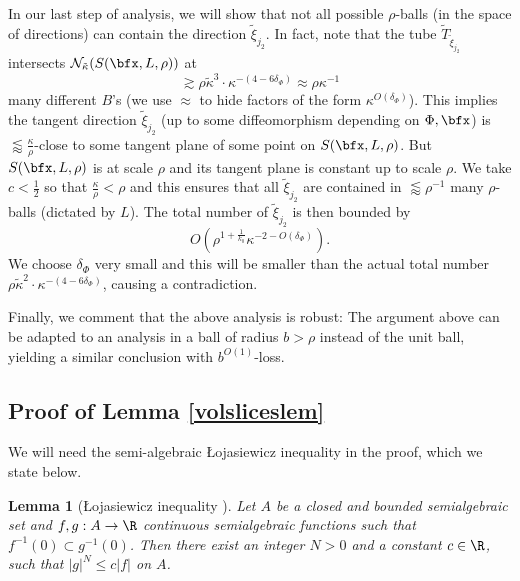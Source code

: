 \documentclass{article}
\numberwithin{equation}{section}
\theoremstyle{plain}
\newtheorem{lemma}[theorem]{Lemma}
\begin{document}
In our last step of analysis, we will show that not all possible $\rho$-balls (in the space of directions) can contain the direction $\tilde{\xi}_{j_2}$. In fact, note that the tube $\tilde{T}_{\tilde{\xi}_{j_2}}$ intersects $\mathcal{N}_{\tilde{\kappa}} (S(\bfx, L, \rho))$ at 
\begin{equation}
    \gtrsim \rho\tilde{\kappa}^3\cdot \kappa^{-(4-6\delta_{\Phi})} \approx \rho \kappa^{-1}
\end{equation}
many different $B$'s (we use $\approx$ to hide factors of the form $\kappa^{O(\delta_{\Phi})}$). This implies the tangent direction $\tilde{\xi}_{j_2}$ (up to some diffeomorphism depending on $\Phi, \bfx$) is $\lessapprox \frac{\kappa}{\rho}$-close to some tangent plane of some point on $S(\bfx, L, \rho)$. But $S(\bfx, L, \rho)$ is at scale $\rho$ and its tangent plane is constant up to scale $\rho$. We take $c< \frac{1}{2}$ so that $\frac{\kappa}{\rho} < \rho$ and this ensures that all $\tilde{\xi}_{j_2}$ are contained in $\lessapprox \rho^{-1}$ many $\rho$-balls (dictated by $L$). The total number of $\tilde{\xi}_{j_2}$ is then bounded by 
\begin{equation}
    O(\rho^{1+\frac{1}{k_0}}\kappa^{-2-O(\delta_{\Phi})}).
\end{equation}
We choose $\delta_{\Phi}$ very small and this will be smaller than the actual total number $\rho\tilde{\kappa}^2\cdot \kappa^{-(4-6\delta_{\Phi})}$, causing a contradiction.
 
Finally, we comment that the above analysis is robust: The argument above can be adapted to an analysis in a ball of radius $b>\rho$ instead of the unit ball, yielding a similar conclusion with $b^{O(1)}$-loss.

\subsection{Proof of Lemma \ref{volsliceslem}}\label{Proofofvolslices}

We will need the semi-algebraic \L ojasiewicz inequality in the proof, which we state below. 

\begin{lemma}[\L ojasiewicz inequality ]\label{lem: loja}
    Let $A$ be a closed and bounded semialgebraic set and $f,g : A \to \R$ continuous semialgebraic functions such that $f^{-1}(0) \subset g^{-1}(0)$. Then there exist an integer $N > 0$ and a constant $c \in \R$, such that $|g|^N \leq c|f|$ on $A$. 
\end{lemma}
\end{document}
